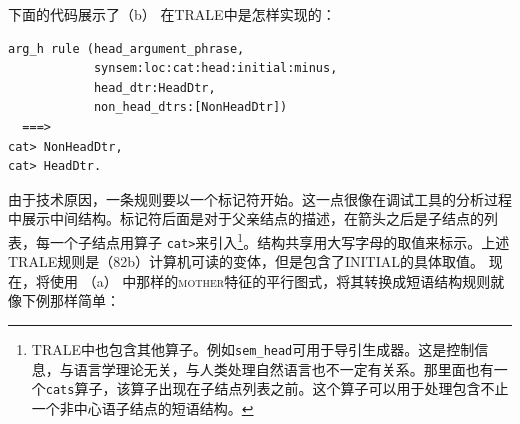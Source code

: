 下面的代码展示了（b） 在TRALE中是怎样实现的：
\begin{verbatim}
arg_h rule (head_argument_phrase,
            synsem:loc:cat:head:initial:minus,
            head_dtr:HeadDtr,
            non_head_dtrs:[NonHeadDtr])
  ===>
cat> NonHeadDtr,
cat> HeadDtr.
\end{verbatim}
由于技术原因，一条规则要以一个标记符开始。这一点很像在调试工具的分析过程中展示中间结构。标记符后面是对于父亲结点的描述，在箭头之后是子结点的列表，每一个子结点用算子 \verb+cat>+来引入\footnote{%
  TRALE中也包含其他算子。例如\texttt{sem\_head}可用于导引生成器。这是控制信息，与语言学理论无关，与人类处理自然语言也不一定有关系。那里面也有一个\texttt{cats}算子，该算子出现在子结点列表之前。这个算子可以用于处理包含不止一个非中心语子结点的短语结构。%
}。结构共享用大写字母的取值来标示。上述TRALE规则是（82b）计算机可读的变体，但是包含了INITIAL的具体取值。
现在，将使用 （a） 中那样的\textsc{mother}特征的平行图式，将其转换成短语结构规则就像下例那样简单：
\eal
\ex {}

